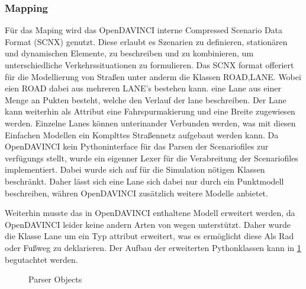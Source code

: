 \documentclass[11pt,oneside,openright]{mpreport}
\begin{document}
\subsubsection{Mapping}
Für das Maping wird das OpenDAVINCI interne Compressed Scenario Data Format (SCNX) \cite{Berger2010} genutzt. Diese erlaubt es Szenarien zu definieren, stationären und dynamischen Elemente, 
zu beschreiben und zu kombinieren, um unterschiedliche Verkehrssituationen zu formulieren. Das SCNX format offeriert für die Modellierung von Straßen unter anderm
die Klassen ROAD,LANE. Wobei eien ROAD dabei aus mehreren LANE's bestehen kann. eine Lane aus einer Menge an Pukten besteht, welche den Verlauf der lane beschreiben.
Der Lane kann weiterhin als Attribut eine Fahrspurmakierung und eine Breite zugewiesen werden. Einzelne Lanes können unterinander Verbunden werden, was mit diesen Einfachen 
Modellen ein Komplttes Straßennetz aufgebaut werden kann. Da OpenDAVINCI kein Pythoninterface für das Parsen der Scenariofiles zur verfügungs stellt, wurde ein eigenner Lexer für die 
Verabreitung der Scenariofiles implementiert. Dabei wurde sich auf für die Simulation nötigen Klassen beschränkt. Daher lässt sich eine Lane sich dabei nur durch ein Punktmodell
beschreiben, währen OpenDAVINCI zusätzlich weitere Modelle anbietet.

Weiterhin musste das in OpenDAVINCI enthaltene Modell erweitert werden, da OpenDAVINCI leider keine andern Arten von wegen unterstützt.
Daher wurde die Klasse Lane um ein Typ attribut erweitert, was es ermöglicht diese Als Rad oder Fußweg zu deklarieren.
Der Aufbau der erweiterten Pythonklassen kann in \cref{parer_objects} begutachtet werden.

\begin{figure}[!ht]
\caption{Parser Objects}

\label{parer_objects}
\end{figure}
\end{document}
